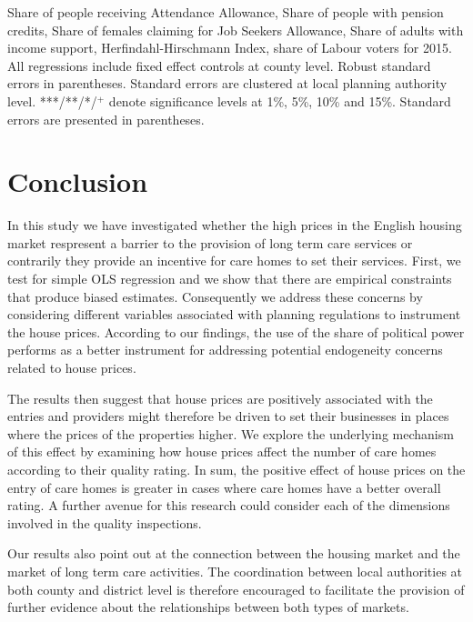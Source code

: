 \documentclass[12pt,letterpaper]{article}
\begin{document}
\begin{table}[ht]
\begin{tablenotes}
      Share of people receiving Attendance Allowance, Share of people with pension credits, 
      Share of females claiming for Job Seekers Allowance, Share of adults with income 
      support, 
      Herfindahl-Hirschmann Index, share of Labour voters for 2015. All regressions include fixed effect controls at
      county level. Robust standard errors in parentheses. Standard errors are clustered at local planning 
      authority level. ***/**/*/$^{+}$ denote significance levels at 1\%, 5\%, 
      10\% and 15\%. Standard errors are presented in parentheses. 
    \end{tablenotes}
\end{table}

\section{Conclusion}

In this study we have investigated whether the high prices in the English housing market respresent a barrier to
 the provision of long term care services or contrarily they provide an incentive for care homes to set their 
 services. First, we test for simple OLS regression and we show that there are empirical constraints that produce
  biased estimates. Consequently we address these concerns by considering different variables associated with
    planning regulations to instrument the house prices. According to our findings, the use of the share of political
     power performs as a better instrument for addressing potential endogeneity concerns related to house prices.
       
       The results then suggest that house prices are positively associated with the entries and providers might
        therefore be driven to set their businesses in places where the prices of the properties higher. We explore 
        the underlying mechanism of this effect by examining how house prices affect the number of care 
        homes according to their quality rating. In sum, the positive effect of house prices on the entry of care
         homes is greater in cases where care homes have a better overall rating. A further avenue for this research
          could consider each of the dimensions involved in the quality inspections. 
          
Our results also point out at the connection between the housing market and the
 market of long term care activities. The coordination between local authorities at
  both county and district level is therefore encouraged to facilitate the provision of 
  further evidence about the relationships between both types of markets. 
  
\newpage



\newpage
\end{document}
